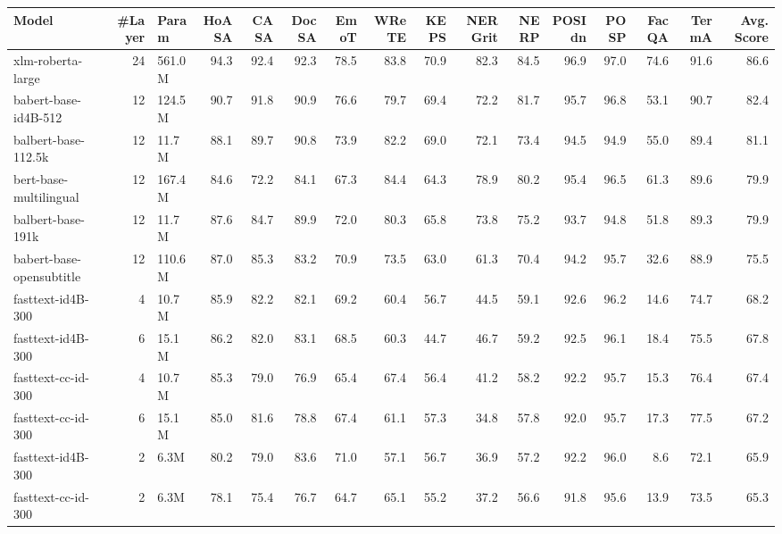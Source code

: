 \begin{tabular}{lrlrrrrrrrrrrrrr}
\toprule
                   Model &  \#Layer &  Param &  HoASA &  CASA &  DocSA &  EmoT &  WReTE &  KEPS &  NERGrit &  NERP &  POSIdn &  POSP &  FacQA &  TermA &  Avg. Score \\
\midrule
       xlm-roberta-large &      24 & 561.0M &   94.3 &  92.4 &   92.3 &  78.5 &   83.8 &  70.9 &     82.3 &  84.5 &    96.9 &  97.0 &   74.6 &   91.6 &        86.6 \\
    babert-base-id4B-512 &      12 & 124.5M &   90.7 &  91.8 &   90.9 &  76.6 &   79.7 &  69.4 &     72.2 &  81.7 &    95.7 &  96.8 &   53.1 &   90.7 &        82.4 \\
     balbert-base-112.5k &      12 &  11.7M &   88.1 &  89.7 &   90.8 &  73.9 &   82.2 &  69.0 &     72.1 &  73.4 &    94.5 &  94.9 &   55.0 &   89.4 &        81.1 \\
  bert-base-multilingual &      12 & 167.4M &   84.6 &  72.2 &   84.1 &  67.3 &   84.4 &  64.3 &     78.9 &  80.2 &    95.4 &  96.5 &   61.3 &   89.6 &        79.9 \\
       balbert-base-191k &      12 &  11.7M &   87.6 &  84.7 &   89.9 &  72.0 &   80.3 &  65.8 &     73.8 &  75.2 &    93.7 &  94.8 &   51.8 &   89.3 &        79.9 \\
babert-base-opensubtitle &      12 & 110.6M &   87.0 &  85.3 &   83.2 &  70.9 &   73.5 &  63.0 &     61.3 &  70.4 &    94.2 &  95.7 &   32.6 &   88.9 &        75.5 \\
       fasttext-id4B-300 &       4 &  10.7M &   85.9 &  82.2 &   82.1 &  69.2 &   60.4 &  56.7 &     44.5 &  59.1 &    92.6 &  96.2 &   14.6 &   74.7 &        68.2 \\
       fasttext-id4B-300 &       6 &  15.1M &   86.2 &  82.0 &   83.1 &  68.5 &   60.3 &  44.7 &     46.7 &  59.2 &    92.5 &  96.1 &   18.4 &   75.5 &        67.8 \\
      fasttext-cc-id-300 &       4 &  10.7M &   85.3 &  79.0 &   76.9 &  65.4 &   67.4 &  56.4 &     41.2 &  58.2 &    92.2 &  95.7 &   15.3 &   76.4 &        67.4 \\
      fasttext-cc-id-300 &       6 &  15.1M &   85.0 &  81.6 &   78.8 &  67.4 &   61.1 &  57.3 &     34.8 &  57.8 &    92.0 &  95.7 &   17.3 &   77.5 &        67.2 \\
       fasttext-id4B-300 &       2 &   6.3M &   80.2 &  79.0 &   83.6 &  71.0 &   57.1 &  56.7 &     36.9 &  57.2 &    92.2 &  96.0 &    8.6 &   72.1 &        65.9 \\
      fasttext-cc-id-300 &       2 &   6.3M &   78.1 &  75.4 &   76.7 &  64.7 &   65.1 &  55.2 &     37.2 &  56.6 &    91.8 &  95.6 &   13.9 &   73.5 &        65.3 \\
\bottomrule
\end{tabular}
